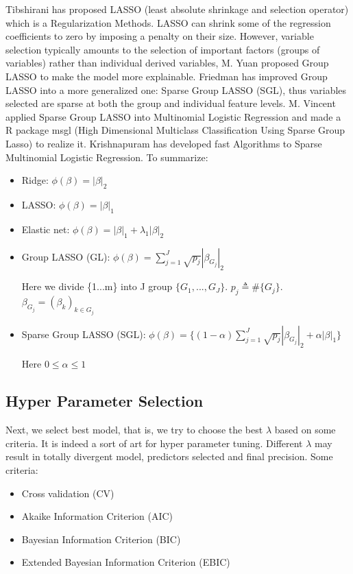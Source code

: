 \documentclass[]{article}
\begin{document}
Tibshirani has proposed LASSO (least absolute shrinkage and selection operator)\cite{tibshirani1996regression} which is a Regularization Methods. LASSO can shrink some of the regression coefficients to zero by imposing a penalty on their size. However, variable selection typically amounts to the selection of important factors (groups of variables) rather than individual derived variables, M. Yuan proposed Group LASSO\cite{yuan2006model} to make the model more explainable. Friedman has improved Group LASSO into a more generalized one: Sparse Group LASSO (SGL)\cite{friedman2010note}, thus variables selected are sparse at both the group and individual feature levels. M. Vincent applied Sparse Group LASSO into Multinomial Logistic Regression\cite{meier2008group} and made a R package msgl (High Dimensional Multiclass Classification Using Sparse Group Lasso) to realize it. Krishnapuram has developed fast Algorithms to Sparse Multinomial Logistic Regression\cite{krishnapuram2005sparse}.
To summarize:
\begin{itemize}
	\item Ridge\cite{hoerl1970ridge}: $\phi(\beta)=|\beta|_2$
	\item LASSO: $\phi(\beta)=|\beta|_1$
	\item Elastic net\cite{zou2005regularization}: $\phi(\beta)=|\beta|_1+\lambda_1 |\beta|_2$
	\item Group LASSO (GL): $\phi(\beta)= \sum_{j=1}^J \sqrt{p_j}|\beta_{G_j}|_2$	
	
	Here we divide \{1...m\} into J group $ \{G_1,...,G_J\} $. $ p_j\triangleq\#\{G_j\} $. $  \beta_{G_j}=(\beta_k)_{k\in G_j} $
	\item Sparse Group LASSO (SGL): $\phi(\beta)= \{(1-\alpha)\sum_{j=1}^J \sqrt{p_j}|\beta_{G_j}|_2
	+\alpha |\beta|_1\}$
	
	Here $0\le \alpha \le 1$
\end{itemize}

\subsection{Hyper Parameter Selection}
Next, we select best model, that is, we try to choose the best $ \lambda $ based on some criteria. It is indeed a sort of art for hyper parameter tuning. Different $ \lambda $ may result in totally divergent model, predictors selected and final precision. Some criteria:
\begin{itemize}
	\item Cross validation (CV)\cite{kohavi1995study}
	\item Akaike Information Criterion (AIC)\cite{akaike2011akaike}
	\item Bayesian Information Criterion (BIC)\cite{posada2004model}
	\item Extended Bayesian Information Criterion (EBIC)\cite{chen2008extended}
\end{itemize}
\end{document}
